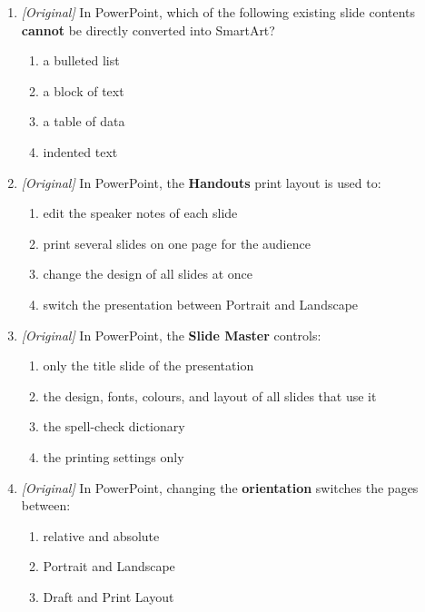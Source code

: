 \documentclass[11pt]{article}
\begin{document}
\begin{enumerate}[label=\textbf{Q\arabic*.}, leftmargin=*]
  \begin{enumerate}[label=\Alph*.]
    \item Esc
    \item Enter
    \item F5
    \item Ctrl+H
  \end{enumerate}
\item \textit{[Original]} In PowerPoint, which of the following existing slide
  contents \textbf{cannot} be directly converted into SmartArt?
  \begin{enumerate}[label=\Alph*.]
    \item a bulleted list
    \item a block of text
    \item a table of data
    \item indented text
  \end{enumerate}
\item \textit{[Original]} In PowerPoint, the \textbf{Handouts} print layout is
  used to:
  \begin{enumerate}[label=\Alph*.]
    \item edit the speaker notes of each slide
    \item print several slides on one page for the audience
    \item change the design of all slides at once
    \item switch the presentation between Portrait and Landscape
  \end{enumerate}
\item \textit{[Original]} In PowerPoint, the \textbf{Slide Master} controls:
  \begin{enumerate}[label=\Alph*.]
    \item only the title slide of the presentation
    \item the design, fonts, colours, and layout of all slides that use it
    \item the spell-check dictionary
    \item the printing settings only
  \end{enumerate}
\item \textit{[Original]} In PowerPoint, changing the \textbf{orientation}
  switches the pages between:
  \begin{enumerate}[label=\Alph*.]
    \item relative and absolute
    \item Portrait and Landscape
    \item Draft and Print Layout

\end{enumerate}
\end{enumerate}
\end{document}
